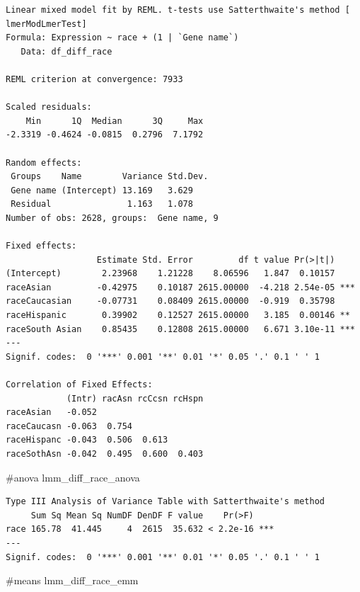 \documentclass[
  letterpaper,
  DIV=11,
  numbers=noendperiod]{scrartcl}
\newenvironment{Shaded}{\begin{snugshade}}{\end{snugshade}}
\newcommand{\CommentTok}[1]{\textcolor[rgb]{0.37,0.37,0.37}{#1}}
\newcommand{\NormalTok}[1]{\textcolor[rgb]{0.00,0.23,0.31}{#1}}
\begin{document}
\begin{verbatim}
Linear mixed model fit by REML. t-tests use Satterthwaite's method [
lmerModLmerTest]
Formula: Expression ~ race + (1 | `Gene name`)
   Data: df_diff_race

REML criterion at convergence: 7933

Scaled residuals: 
    Min      1Q  Median      3Q     Max 
-2.3319 -0.4624 -0.0815  0.2796  7.1792 

Random effects:
 Groups    Name        Variance Std.Dev.
 Gene name (Intercept) 13.169   3.629   
 Residual               1.163   1.078   
Number of obs: 2628, groups:  Gene name, 9

Fixed effects:
                  Estimate Std. Error         df t value Pr(>|t|)    
(Intercept)        2.23968    1.21228    8.06596   1.847  0.10157    
raceAsian         -0.42975    0.10187 2615.00000  -4.218 2.54e-05 ***
raceCaucasian     -0.07731    0.08409 2615.00000  -0.919  0.35798    
raceHispanic       0.39902    0.12527 2615.00000   3.185  0.00146 ** 
raceSouth Asian    0.85435    0.12808 2615.00000   6.671 3.10e-11 ***
---
Signif. codes:  0 '***' 0.001 '**' 0.01 '*' 0.05 '.' 0.1 ' ' 1

Correlation of Fixed Effects:
            (Intr) racAsn rcCcsn rcHspn
raceAsian   -0.052                     
raceCaucasn -0.063  0.754              
raceHispanc -0.043  0.506  0.613       
raceSothAsn -0.042  0.495  0.600  0.403
\end{verbatim}

\begin{Shaded}
\begin{Highlighting}[]
\CommentTok{\#anova}
\NormalTok{lmm\_diff\_race\_anova}
\end{Highlighting}
\end{Shaded}

\begin{verbatim}
Type III Analysis of Variance Table with Satterthwaite's method
     Sum Sq Mean Sq NumDF DenDF F value    Pr(>F)    
race 165.78  41.445     4  2615  35.632 < 2.2e-16 ***
---
Signif. codes:  0 '***' 0.001 '**' 0.01 '*' 0.05 '.' 0.1 ' ' 1
\end{verbatim}

\begin{Shaded}
\begin{Highlighting}[]
\CommentTok{\#means }
\NormalTok{lmm\_diff\_race\_emm}
\end{Highlighting}
\end{Shaded}
\end{document}
